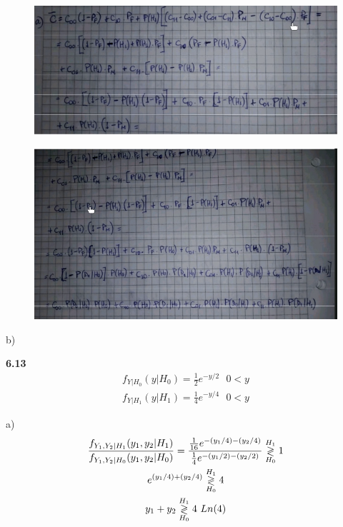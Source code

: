 \begin{figure}[H]
\centering
	\includegraphics[width=1\textwidth]{Imagenes/chinardo1.png}
\end{figure}

\begin{figure}[H]
\centering
	\includegraphics[width=1\textwidth]{Imagenes/chinardo2.png}
\end{figure}

b)

\vspace{1cm}

\textbf{6.13}
\begin{equation*}
\begin{gathered}
	f_{Y|H_0}(y|H_0) = \frac{1}{2} e^{-y/2} \ \ \ 0 < y \\
	f_{Y|H_1}(y|H_1) = \frac{1}{4} e^{-y/4} \ \ \ 0 < y
\end{gathered}
\end{equation*}

a)
\begin{equation*}
\begin{gathered}
	\frac{f_{Y_1, Y_2 |H_1}(y_1, y_2|H_1)}{f_{Y_1, Y_2 |H_0}(y_1, y_2|H_0)} = \frac{\frac{1}{16} e^{-(y_1/4) - (y_2/4)}}{\frac{1}{4} e^{-(y_1/2) - (y_2/2)}} \overset{H_1}{\underset{H_0}{\gtrless}} 1	\\
	e^{(y_1/4) + (y_2/4)} \overset{H_1}{\underset{H_0}{\gtrless}} 4 \\
	y_1 + y_2 \overset{H_1}{\underset{H_0}{\gtrless}} 4 \ Ln(4)
\end{gathered}
\end{equation*}

